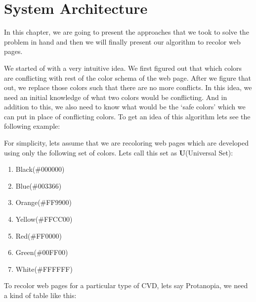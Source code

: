 \chapter{System Architecture}
\thispagestyle{plain}


\label{System Architecture}
In this chapter, we are going to present the approaches that we took to solve the problem in hand and then we will finally present our algorithm to recolor web pages.

We started of with a very intuitive idea. We first figured out that which colors are conflicting with rest of the color schema of the web page. After we figure that out, we replace those colors such that there are no more conflicts. In this idea, we need an initial knowledge of what two colors would be conflicting. And in addition to this, we also need to know what would be the ‘safe colors’ which we can put in place of conflicting colors. To get an idea of this algorithm lets see the following example:

For simplicity, lets assume that we are recoloring web pages which are developed using only the following set of colors. Lets call this set as \textbf{U}(Universal Set):
\begin{enumerate}
    \item Black(\#000000)
    \item Blue(\#003366)
    \item Orange(\#FF9900)
    \item Yellow(\#FFCC00)
    \item Red(\#FF0000)
    \item Green(\#00FF00)
    \item White(\#FFFFFF)
\end{enumerate}

To recolor web pages for a particular type of CVD, lets say Protanopia, we need a kind of table like this:

{\vspace{10mm}}
\label{Tick}

